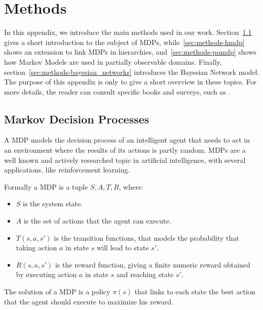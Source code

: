 
\chapter{Methods} %

\label{appendix-methods} %


In this appendix, we introduce the main methods used in our work. Section~\ref{sec:methods-mdp} gives a short introduction to the subject of MDPs, while~\ref{sec:methods-hmdp} shows an extension to link MDPs in hierarchies, and~\ref{sec:methods-pomdp} shows how Markov Models are used in partially observable domains. Finally, section~\ref{sec:methods-bayesian_networks} introduces the Bayesian Network model. The purpose of this appendix is only to give a short overview in these topics. For more details, the reader can consult specific books and surveys, such as \cite{2012Mausam}.
  
\section{Markov Decision Processes}
\label{sec:methods-mdp}
A MDP models the decision process of an intelligent agent that needs to act in an environment where the results of its actions is partly random. MDPs are a well known and actively researched topic in artificial intelligence, with several applications, like reinforcement learning.

Formally a MDP is a tuple $S,A,T,R$, where: 
\begin{itemize}
\item $S$ is the system state.
\item $A$ is the set of actions that the agent can execute.
\item $T(s,a,s')$ is the transition functions, that models the probability that taking action $a$ in state $s$ will lead to state $s'$.
\item $R(s,a,s')$ is the reward function, giving a finite numeric reward obtained by executing action $a$ in state $s$ and reaching state $s'$.
\end{itemize}

The solution of a MDP is a policy $\pi(s)$ that links to each state the best action that the agent should execute to maximize his reward.

